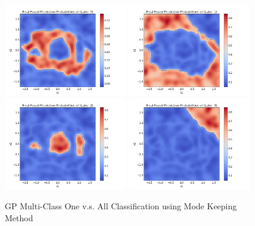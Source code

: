 				\begin{figure}[!htbp]
					\centering
						\includegraphics[width=0.48\textwidth]{Figures/Progress/modekeepingOVA/Figure5.png}
						\includegraphics[width=0.48\textwidth]{Figures/Progress/modekeepingOVA/Figure6.png}
						\includegraphics[width=0.48\textwidth]{Figures/Progress/modekeepingOVA/Figure7.png}
						\includegraphics[width=0.48\textwidth]{Figures/Progress/modekeepingOVA/Figure8.png}
					\caption{GP Multi-Class One v.s. All Classification using Mode Keeping Method}
					\label{ProgressReport:GaussianProcessModels:Figure:modekeepingOVA2}
				\end{figure}
				
